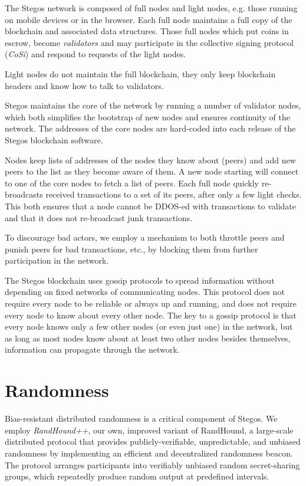 \documentclass[a4paper, 10pt, conference]{ieeeconf}
\begin{document}
The Stegos network is composed of full nodes and light nodes, e.g. those running on mobile devices or in the browser. Each full node maintains a full copy of the blockchain and associated data structures. Those full nodes which put coins in escrow, become \textit{validators} and may participate in the collective signing protocol (\textit{CoSi}) and respond to requests of the light nodes. 

Light nodes do not maintain the full blockchain, they only keep blockchain headers and know how to talk to validators. 

Stegos maintains the core of the network by running a number of validator nodes, which both simplifies the bootstrap of new nodes and ensures continuity of the network. The addresses of the core nodes are hard-coded into each release of the Stegos blockchain software.

Nodes keep lists of addresses of the nodes they know about (peers) and add new peers to the list as they become aware of them. A new node starting will connect to one of the core nodes to fetch a list of peers. Each full node quickly re-broadcasts received transactions to a set of its peers, after only a few light checks. This both ensures that a node cannot be DDOS-ed with transactions to validate and that it does not re-broadcast junk transactions.

To discourage bad actors, we employ a mechanism to both throttle peers and punish peers for bad transactions, etc., by blocking them from further participation in the network.

The Stegos blockchain uses gossip protocols to spread information without depending on fixed networks of communicating nodes. This protocol does not require every node to be reliable or always up and running, and does not require every node to know about every other node. The key to a gossip protocol is that every node knows only a few other nodes (or even just one) in the network, but as long as most nodes know about at least two other nodes besides themselves, information can propagate through the network.

\section{Randomness}\label{randomness}

Bias-resistant distributed randomness is a critical component of Stegos. We employ \textit{RandHound++}, our own, improved variant of RandHound\cite{c12}, a large-scale distributed protocol that provides publicly-verifiable, unpredictable, and unbiased randomness by implementing an efficient and decentralized randomness beacon. The protocol arranges participants into verifiably unbiased random secret-sharing groups, which repeatedly produce random output at predefined intervals. 
\end{document}
